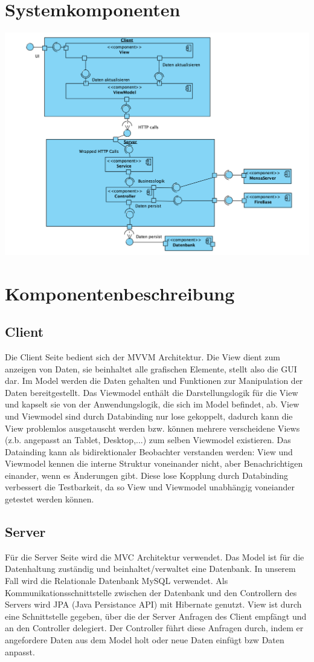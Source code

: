 \documentclass[a4paper]{scrreprt}
\begin{document}
\section{Systemkomponenten}
\includegraphics[width=1.1\textwidth]{Objektdiagramme/komponentDiagramm.png}
\section{Komponentenbeschreibung}
\subsection{Client}
Die Client Seite bedient sich der MVVM Architektur. Die View dient zum anzeigen von Daten, sie beinhaltet alle grafischen Elemente, stellt also die \Gls{GUI} dar. Im Model werden die Daten gehalten und Funktionen zur Manipulation der Daten bereitgestellt.
Das Viewmodel enthält die Darstellungslogik für die View und kapselt sie von der \Gls{Anwendungslogik}, die sich im Model befindet, ab.
View und Viewmodel sind durch Databinding nur lose gekoppelt, dadurch kann die View problemlos ausgetauscht werden bzw. können mehrere verscheidene Views (z.b. angepasst an Tablet, Desktop,...) zum selben Viewmodel existieren.
Das Datainding kann als bidirektionaler \Gls{Beobachter} verstanden werden: View und Viewmodel kennen die interne Struktur voneinander nicht, aber Benachrichtigen einander, wenn es Änderungen gibt. Diese lose Kopplung durch Databinding verbessert die Testbarkeit, da so View und Viewmodel unabhängig voneiander getestet werden können.

\subsection{Server}
Für die \Gls{Server} Seite wird die MVC Architektur verwendet.
Das Model ist für die Datenhaltung zuständig und beinhaltet/verwaltet eine Datenbank.  In unserem Fall wird die \Gls{Relationale Datenbank} \Gls{MySQL} verwendet. Als Kommunikationsschnittstelle zwischen der Datenbank und den Controllern des Servers wird JPA (Java Persistance API) mit Hibernate genutzt.
View ist durch eine Schnittstelle gegeben, über die der Server Anfragen des \Gls{Client} empfängt und an den Controller delegiert. Der Controller führt diese Anfragen durch, indem er angefordere Daten aus dem Model holt oder neue Daten einfügt bzw Daten anpasst.
\end{document}
